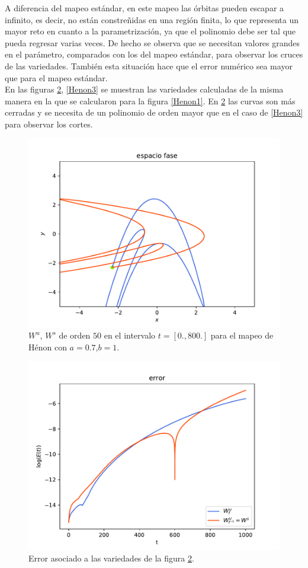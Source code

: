 A diferencia del mapeo estándar, en este mapeo las órbitas pueden escapar a infinito, es decir, no están  constreñidas en una región finita, lo que representa un mayor reto en cuanto a la parametrización, ya que el polinomio debe ser tal que pueda regresar varias veces. De hecho se observa que se necesitan valores grandes en el parámetro, comparados con los del mapeo estándar, para observar los cruces de las variedades. También esta situación hace que el error numérico sea mayor que para el mapeo estándar. \\

En las figuras \ref{Henon2}, \ref{Henon3} se muestran las variedades calculadas de la misma manera en la que se calcularon para la figura \ref{Henon1}. En \ref{Henon2} las curvas son más cerradas y se necesita de un polinomio de orden mayor que en el caso de \ref{Henon3} para observar los cortes. 
\begin{figure}[H]
\centering
\includegraphics[scale=0.7]{h07}
\caption{$W^{u}$, $W^{s}$ de orden $50$ en el intervalo $t=[0.,800.]$ para el mapeo de Hénon con $a=0.7$,$b=1.$}
\label{Henon2}
\end{figure}

\begin{figure}[H]
\centering
\includegraphics[scale=0.7]{errorH07}
\caption{Error asociado a las variedades de la figura \ref{Henon2}.}
\label{Henon2}
\end{figure}


